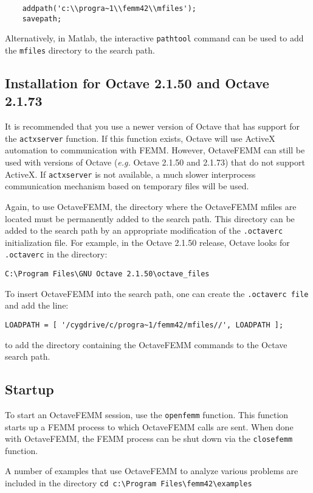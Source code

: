 \documentclass[12pt]{article}
\begin{document}
\begin{verbatim}
	addpath('c:\\progra~1\\femm42\\mfiles');
	savepath;
\end{verbatim}

Alternatively, in Matlab, the interactive {\tt pathtool} command can be used
to add the {\tt mfiles} directory to the search path.

\subsection{Installation for Octave 2.1.50 and Octave 2.1.73}

It is recommended that you use a newer version of Octave that has support
for the {\tt actxserver} function.  If this function exists, Octave will use
ActiveX automation to communication with FEMM.  However, OctaveFEMM can
still be used with versions of Octave ({\em e.g.} Octave 2.1.50 and 2.1.73)
that do not support ActiveX. If {\tt actxserver} is not available, a much
slower interprocess communication mechanism based on temporary files will be
used.

Again, to use OctaveFEMM, the directory where the OctaveFEMM mfiles are located
must be permanently added to the search path.  This directory can be added to
the search path by an appropriate modification of the \verb+.octaverc+ initialization
file. For example, in the
Octave 2.1.50 release, Octave looks for \verb+.octaverc+ in the directory:

\verb+C:\Program Files\GNU Octave 2.1.50\octave_files+

To insert OctaveFEMM into the search path, one can create the {\tt .octaverc file} and
add the line:

\verb+LOADPATH = [ '/cygdrive/c/progra~1/femm42/mfiles//', LOADPATH ];+

to add the directory containing the OctaveFEMM commands to the Octave search path.

\subsection{Startup}
To start an OctaveFEMM session, use the {\tt openfemm} function.
This function starts up a FEMM process to which OctaveFEMM calls
are sent. When done with OctaveFEMM, the FEMM process can be shut
down via the {\tt closefemm} function.

A number of examples that use OctaveFEMM to analyze various problems
are included in the directory \verb+cd c:\Program Files\femm42\examples+
\end{document}
